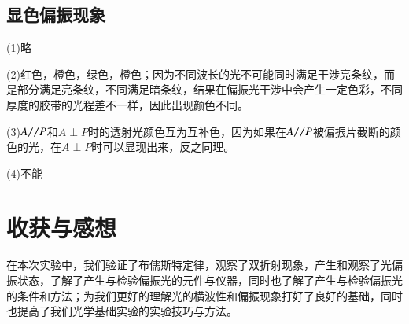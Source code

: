 \documentclass[UTF8]{ctexart}
\begin{document}
\subsection{显色偏振现象}
(1)略
\par (2)红色，橙色，绿色，橙色；因为不同波长的光不可能同时满足干涉亮条纹，而是部分满足亮条纹，不同满足暗条纹，结果在偏振光干涉中会产生一定色彩，不同厚度的胶带的光程差不一样，因此出现颜色不同。
\par (3)$A\verb*|//|P$和$A\perp P$时的透射光颜色互为互补色，因为如果在$A\verb|//| P$被偏振片截断的颜色的光，在$A\perp P$时可以显现出来，反之同理。
\par (4)不能
	\section{收获与感想}
	在本次实验中，我们验证了布儒斯特定律，观察了双折射现象，产生和观察了光偏振状态，了解了产生与检验偏振光的元件与仪器，同时也了解了产生与检验偏振光的条件和方法；为我们更好的理解光的横波性和偏振现象打好了良好的基础，同时也提高了我们光学基础实验的实验技巧与方法。
\end{document}
